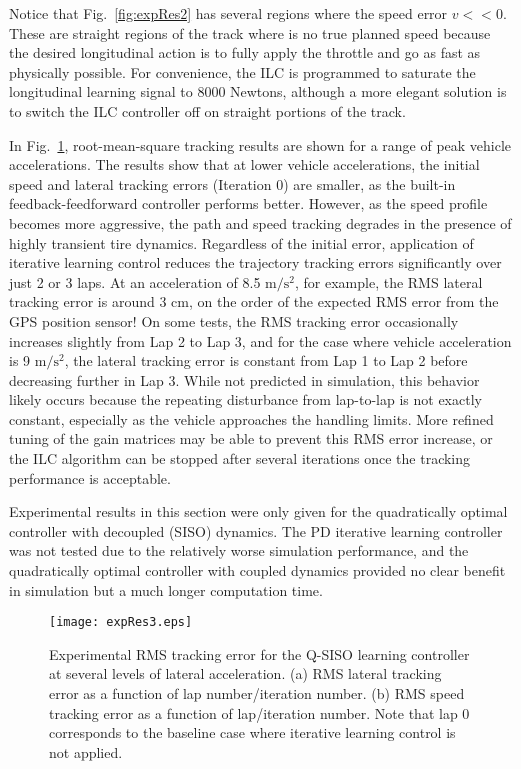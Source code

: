  Notice that Fig.~\ref{fig:expRes2} has
several regions where the speed error $v << 0$. These are straight regions of the track where is no true planned speed
because the desired longitudinal action is to fully apply the throttle and go as fast as physically possible. For convenience, the ILC is programmed to saturate the longitudinal
learning signal to 8000 Newtons, although a more elegant solution is to switch the ILC controller off on straight portions of the track. 

In Fig.~\ref{fig:expRes3}, root-mean-square tracking results are shown for a range of peak vehicle accelerations. 
The results show that at lower vehicle accelerations,
the initial speed and lateral tracking errors (Iteration 0) are smaller, as the built-in feedback-feedforward controller 
performs better. However, as the speed profile becomes more aggressive, the path and speed tracking degrades in the presence
of highly transient tire dynamics. Regardless of the initial error, application of iterative learning control 
reduces the trajectory tracking errors significantly over just 2 or 3 laps. At an acceleration of 8.5 $\mathrm{m/s^2}$, for example, the RMS
lateral tracking error is around 3 cm, on the order of the expected RMS error from the GPS position sensor! 
On some tests, the RMS tracking error 
occasionally increases slightly from
Lap 2 to Lap 3, and for the case where vehicle acceleration is 9 $\mathrm{m/s^2}$, the lateral tracking error is constant from Lap 1 to Lap 2
before decreasing further in Lap 3. While not predicted in simulation, this behavior likely occurs because the repeating disturbance
from lap-to-lap is not exactly constant, especially as the vehicle approaches the handling limits. More refined tuning of the gain matrices may be able to prevent 
this RMS error increase, or the ILC algorithm can be stopped after several iterations once the tracking performance is acceptable.

Experimental results in this section were only given for the quadratically optimal controller with decoupled (SISO) dynamics. 
The PD iterative learning controller was not tested due to the relatively worse simulation performance, and the quadratically optimal 
controller with coupled dynamics provided no clear benefit in simulation but a much longer computation time. 



\begin{figure}
\centering
\texttt{[image: expRes3.eps]}
\caption[Experimental RMS tracking error for the Q-SISO learning controller at several levels of lateral acceleration. ]{Experimental RMS tracking error for the Q-SISO learning controller at several levels of lateral acceleration. (a) RMS lateral tracking
error as a function of lap number/iteration number. (b) RMS speed tracking error as a function of lap/iteration number. Note that lap 0 corresponds
to the baseline case where iterative learning control is not applied.}
\label{fig:expRes3}
\end{figure}

